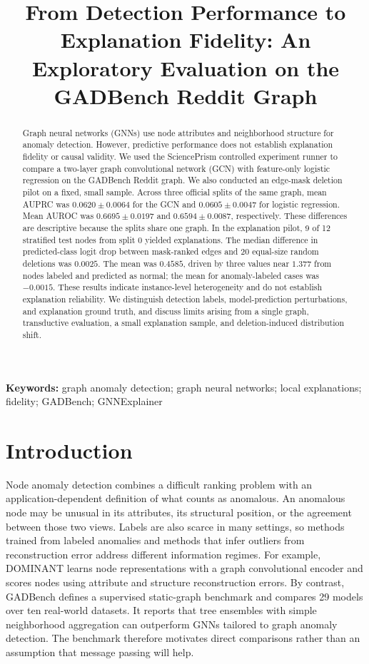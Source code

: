 \documentclass[11pt,a4paper]{article}
\title{From Detection Performance to Explanation Fidelity: An Exploratory Evaluation on the GADBench Reddit Graph}
\author{}
\date{}
\begin{document}
\maketitle

\begin{abstract}
Graph neural networks (GNNs) use node attributes and neighborhood structure for anomaly detection. However, predictive performance does not establish explanation fidelity or causal validity. We used the SciencePrism controlled experiment runner to compare a two-layer graph convolutional network (GCN) with feature-only logistic regression on the GADBench Reddit graph. We also conducted an edge-mask deletion pilot on a fixed, small sample. Across three official splits of the same graph, mean AUPRC was $0.0620\pm0.0064$ for the GCN and $0.0605\pm0.0047$ for logistic regression. Mean AUROC was $0.6695\pm0.0197$ and $0.6594\pm0.0087$, respectively. These differences are descriptive because the splits share one graph. In the explanation pilot, 9 of 12 stratified test nodes from split 0 yielded explanations. The median difference in predicted-class logit drop between mask-ranked edges and 20 equal-size random deletions was $0.0025$. The mean was $0.4585$, driven by three values near $1.377$ from nodes labeled and predicted as normal; the mean for anomaly-labeled cases was $-0.0015$. These results indicate instance-level heterogeneity and do not establish explanation reliability. We distinguish detection labels, model-prediction perturbations, and explanation ground truth, and discuss limits arising from a single graph, transductive evaluation, a small explanation sample, and deletion-induced distribution shift.
\end{abstract}

\noindent\textbf{Keywords:} graph anomaly detection; graph neural networks; local explanations; fidelity; GADBench; GNNExplainer

\section{Introduction}
Node anomaly detection combines a difficult ranking problem with an application-dependent definition of what counts as anomalous. An anomalous node may be unusual in its attributes, its structural position, or the agreement between those two views. Labels are also scarce in many settings, so methods trained from labeled anomalies and methods that infer outliers from reconstruction error address different information regimes. For example, DOMINANT learns node representations with a graph convolutional encoder and scores nodes using attribute and structure reconstruction errors\cite{ding2019dominant}. By contrast, GADBench defines a supervised static-graph benchmark and compares 29 models over ten real-world datasets\cite{tang2023gadbench}. It reports that tree ensembles with simple neighborhood aggregation can outperform GNNs tailored to graph anomaly detection. The benchmark therefore motivates direct comparisons rather than an assumption that message passing will help.
\end{document}
